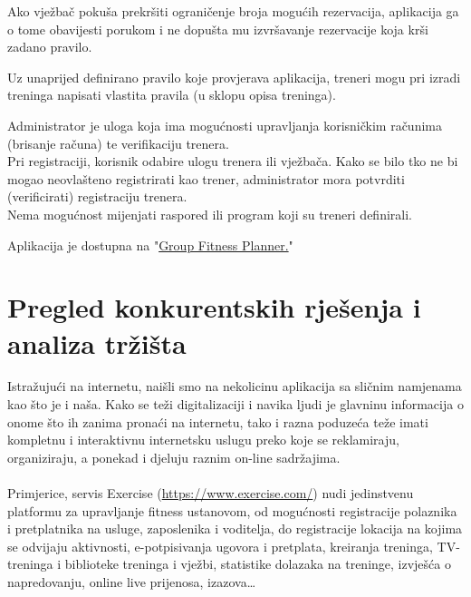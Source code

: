         
        {Ako vježbač pokuša prekršiti ograničenje broja mogućih rezervacija, aplikacija ga o tome obavijesti porukom i ne dopušta mu izvršavanje rezervacije koja krši zadano pravilo.\\}
        
        {Uz unaprijed definirano pravilo koje provjerava aplikacija, treneri mogu pri izradi treninga napisati vlastita pravila (u sklopu opisa treninga).\\}
        
        {Administrator je uloga koja ima mogućnosti upravljanja korisničkim računima (brisanje računa) te verifikaciju trenera.\\
        Pri registraciji, korisnik odabire ulogu trenera ili vježbača. Kako se bilo tko ne bi mogao neovlašteno registrirati kao trener, administrator mora potvrditi (verificirati) registraciju trenera.\\
        Nema mogućnost mijenjati raspored ili program koji su treneri definirali.\\}

        
        {Aplikacija je dostupna na "\href{https://group-fitness-planer-q3fc.onrender.com}{Group Fitness Planner.}"}
		\eject

        \section{Pregled konkurentskih rješenja i analiza tržišta\\}

        {Istražujući na internetu, naišli smo na nekolicinu aplikacija sa sličnim namjenama kao što je i naša. Kako se teži digitalizaciji i navika ljudi je glavninu informacija o onome što ih zanima pronaći na internetu, tako i razna poduzeća teže imati kompletnu i interaktivnu internetsku uslugu preko koje se reklamiraju, organiziraju, a ponekad i djeluju raznim on-line sadržajima. \\ \\ }
        {Primjerice, servis Exercise (\href{https://www.exercise.com}{https://www.exercise.com/}) nudi jedinstvenu platformu za upravljanje fitness ustanovom, od mogućnosti registracije polaznika i pretplatnika na usluge, zaposlenika i voditelja, do registracije lokacija na kojima se odvijaju aktivnosti, e-potpisivanja ugovora i pretplata, kreiranja treninga, TV-treninga i biblioteke treninga i vježbi, statistike dolazaka na treninge, izvješća o napredovanju, online live prijenosa, izazova…}
        
